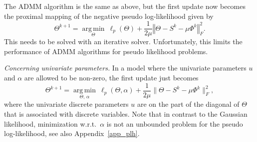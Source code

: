 \documentclass{article}
\newcommand{\bNorm}[1]{\left\Vert #1\right\Vert} %
\DeclareMathOperator{\argmin}{arg\,min}
\begin{document}
The ADMM algorithm is the same as above, but the first update now becomes the proximal mapping of the negative pseudo log-likelihood given by
 \[\Theta^{k+1} = \underset{\Theta}{\argmin} \: \ell_p(\Theta)  + \frac{1}{2\mu}\bNorm{\Theta - S^k - \mu\Phi^k}_F^2.\]
This needs to be solved with an iterative solver. Unfortunately, this limits the performance of ADMM algorithms for pseudo likelihood problems.
\medskip

\emph{Concerning univariate parameters.}
In a model where the univariate parameters $u$ and $\alpha$ are allowed to be non-zero, the first update just becomes
\[\Theta^{k+1} = \underset{\Theta, \,\alpha}{\argmin} \: \ell_p(\Theta, \alpha) + \frac{1}{2\mu}\|\Theta-S^k-\mu\Phi^k\|_F^2,\]
where the univariate discrete parameters $u$ are on the part of the diagonal of $\Theta$ that is associated with discrete variables.
Note that in contrast to the Gaussian likelihood, minimization w.r.t.~$\alpha$ is not an unbounded problem for the pseudo log-likelihood, see also Appendix~\ref{app_plh}.
%
\end{document}
